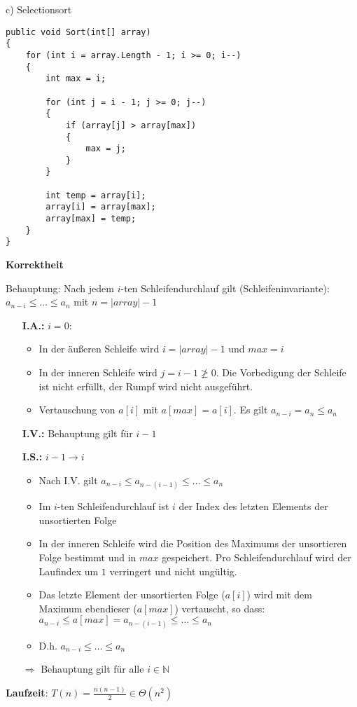 c) Selectionsort
\begin{verbatim}
public void Sort(int[] array)
{
    for (int i = array.Length - 1; i >= 0; i--)
    {
        int max = i;

        for (int j = i - 1; j >= 0; j--)
        {
            if (array[j] > array[max])
            {
                max = j;
            }
        }

        int temp = array[i];
        array[i] = array[max];
        array[max] = temp;
    }
}
\end{verbatim}

\textbf{Korrektheit}

Behauptung: Nach jedem $i$-ten Schleifendurchlauf gilt (Schleifeninvariante): $a_{n-i} \leq \ldots \leq a_n$ mit $n = |array| - 1$
\begin{itemize}[noitemsep]
    \item[\textbf{I.A.:}] $i = 0$: 
    \item[] \begin{itemize}[nolistsep, noitemsep]
    	\item In der äußeren Schleife wird $i = |array| - 1$ und $max = i$
        \item In der inneren Schleife wird $j = i - 1 \not \geq 0$. Die Vorbedigung der Schleife ist nicht erfüllt, der Rumpf wird nicht ausgeführt.
        \item Vertauschung von $a[i]$ mit $a[max] = a[i]$. Es gilt $a_{n-i} = a_n \leq a_n$
    \end{itemize}
    \item[\textbf{I.V.:}] Behauptung gilt für $i -1$
    \item[\textbf{I.S.:}] $i-1 \rightarrow i$
    \item[] \begin{itemize}[nolistsep, noitemsep]
    	\item Nach I.V. gilt $a_{n-i} \leq a_{n-(i-1)} \leq \ldots \leq a_n$
        \item Im $i$-ten Schleifendurchlauf ist $i$ der Index des letzten Elements der unsortierten Folge
        \item In der inneren Schleife wird die Position des Maximums der unsortieren Folge bestimmt und in $max$ gespeichert. Pro Schleifendurchlauf wird der Laufindex um $1$ verringert und nicht ungültig.
        \item Das letzte Element der unsortierten Folge ($a[i]$) wird mit dem Maximum ebendieser ($a[max]$) vertauscht, so dass: $a_{n-i} \leq a[max] = a_{n-(i-1)} \leq \ldots \leq a_n$
        \item D.h. $a_{n-i} \leq \ldots \leq a_n$
    \end{itemize}
    \item[$\Rightarrow$] Behauptung gilt für alle $i \in \mathbb{N}$
\end{itemize} \nuffsaid

\textbf{Laufzeit}: $T(n) = \frac{n(n-1)}{2} \in \Theta(n^2)$